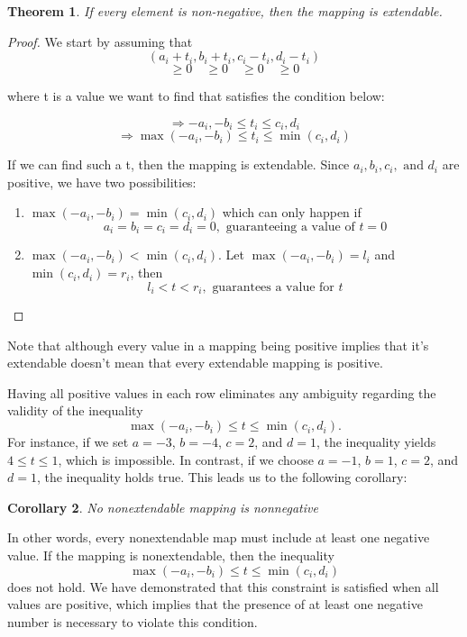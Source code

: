 \documentclass[11pt]{amsart}
\newtheorem{thm}{Theorem}[section]
\newtheorem{cor}[thm]{Corollary}
\theoremstyle{definition}
\begin{document}
\begin{thm}
    If every element is non-negative, then the mapping is extendable.
\end{thm}
\begin{proof}
We start by assuming that 
\[
(a_i + t_i, b_i + t_i, c_i - t_i, d_i - t_i)
\]
\[
\geq 0 \quad \geq 0 \quad \geq 0 \quad \geq 0 
\]

where t is a value we want to find that satisfies the condition below: 

\[
\Rightarrow -a_i, - b_i \le t_i \le c_i, d_i
\]
\[
\Rightarrow \max(-a_i, - b_i) \le t_i \le \min(c_i, d_i)
\]

If we can find such a t, then the mapping is extendable. Since \(a_i, b_i, c_i, \text{ and } d_i\) are positive,  we have two possibilities:

\begin{enumerate}
    \item \(\max(-a_i, - b_i) = \min(c_i, d_i)\) which can only happen if 
    \[
    a_i = b_i = c_i = d_i = 0, \text{ guaranteeing a value of } t = 0
    \]
    \item \(\max(-a_i, - b_i) < \min(c_i, d_i)\). Let \(\max(-a_i, - b_i) = l_i\) and \(\min(c_i, d_i) = r_i\), then
    \[
    l_i < t < r_i, \text{ guarantees a value for } t
    \]
\end{enumerate}
\end{proof}

Note that although every value in a mapping being positive implies that it's extendable doesn't mean that every extendable mapping is positive.

Having all positive values in each row eliminates any ambiguity regarding the validity of the inequality 
\[
\max(-a_i, -b_i) \leq t \leq \min(c_i, d_i).
\]
For instance, if we set \(a = -3\), \(b = -4\), \(c = 2\), and \(d = 1\), the inequality yields \(4 \leq t \leq 1\), which is impossible. In contrast, if we choose \(a = -1\), \(b = 1\), \(c = 2\), and \(d = 1\), the inequality holds true. This leads us to the following corollary:

\begin{cor}
    No nonextendable mapping is nonnegative
\end{cor}

In other words, every nonextendable map must include at least one negative value. If the mapping is nonextendable, then the inequality 
\[
\max(-a_i, -b_i) \leq t \leq \min(c_i, d_i)
\]
does not hold. We have demonstrated that this constraint is satisfied when all values are positive, which implies that the presence of at least one negative number is necessary to violate this condition.
\end{document}
